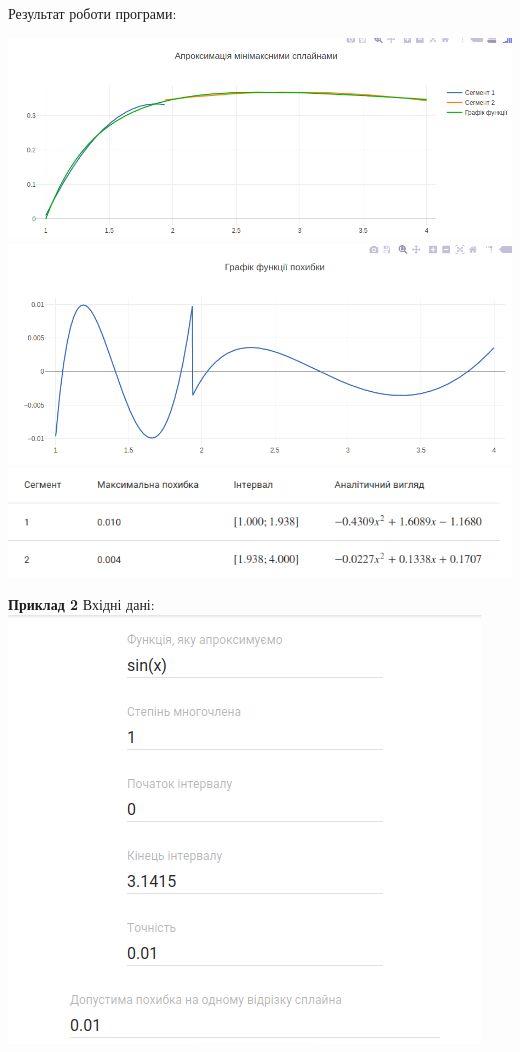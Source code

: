 \documentclass[ukrainian,14pt]{extarticle}
\begin{document}
Результат роботи програми:

\includegraphics[scale=0.5]{example1}
\includegraphics[scale=0.5]{example1_error} \\
\includegraphics[scale=0.5]{example1_table}

\newpage
\textbf{Приклад 2}
Вхідні дані:
\vspace{0.5cm}
\\
\includegraphics[scale=0.7]{example_2_inputs}
\end{document}
